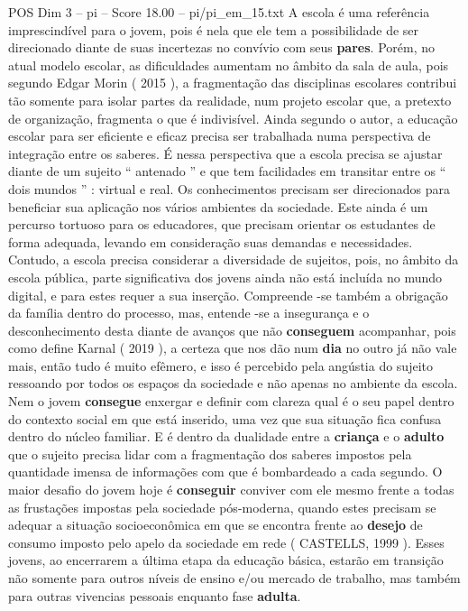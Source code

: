 \begin{textsample}{POS Dim 3 – pi – Score 18.00 – pi/pi\_em\_15.txt}
A escola é uma referência imprescindível para o jovem, pois é nela que ele tem a possibilidade de ser direcionado diante de suas incertezas no convívio com seus \textbf{pares}.
Porém, no atual modelo escolar, as dificuldades aumentam no âmbito da sala de aula, pois segundo Edgar Morin ( 2015 ), a fragmentação das disciplinas escolares contribui tão somente para isolar partes da realidade, num projeto escolar que, a pretexto de organização, fragmenta o que é indivisível.
Ainda segundo o autor, a educação escolar para ser eficiente e eficaz precisa ser trabalhada numa perspectiva de integração entre os saberes.
É nessa perspectiva que a escola precisa se ajustar diante de um sujeito “ antenado ” e que tem facilidades em transitar entre os “ dois mundos ” : virtual e real.
Os conhecimentos precisam ser direcionados para beneficiar sua aplicação nos vários ambientes da sociedade.
Este ainda é um percurso tortuoso para os educadores, que precisam orientar os estudantes de forma adequada, levando em consideração suas demandas e necessidades.
Contudo, a escola precisa considerar a diversidade de sujeitos, pois, no âmbito da escola pública, parte significativa dos jovens ainda não está incluída no mundo digital, e para estes requer a sua inserção.
Compreende -se também a obrigação da família dentro do processo, mas, entende -se a insegurança e o desconhecimento desta diante de avanços que não \textbf{conseguem} acompanhar, pois como define Karnal ( 2019 ), a certeza que nos dão num \textbf{dia} no outro já não vale mais, então tudo é muito efêmero, e isso é percebido pela angústia do sujeito ressoando por todos os espaços da sociedade e não apenas no ambiente da escola.
Nem o jovem \textbf{consegue} enxergar e definir com clareza qual é o seu papel dentro do contexto social em que está inserido, uma vez que sua situação fica confusa dentro do núcleo familiar.
E é dentro da dualidade entre a \textbf{criança} e o \textbf{adulto} que o sujeito precisa lidar com a fragmentação dos saberes impostos pela quantidade imensa de informações com que é bombardeado a cada segundo.
O maior desafio do jovem hoje é \textbf{conseguir} conviver com ele mesmo frente a todas as frustações impostas pela sociedade pós-moderna, quando estes precisam se adequar a situação socioeconômica em que se encontra frente ao \textbf{desejo} de consumo imposto pelo apelo da sociedade em rede ( CASTELLS, 1999 ).
Esses jovens, ao encerrarem a última etapa da educação básica, estarão em transição não somente para outros níveis de ensino e/ou mercado de trabalho, mas também para outras vivencias pessoais enquanto fase \textbf{adulta}.

\end{textsample}
